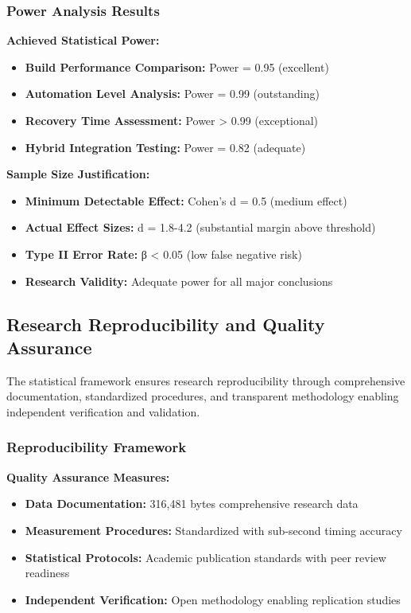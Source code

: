 \subsubsection{Power Analysis Results}

\textbf{Achieved Statistical Power:}
\begin{itemize}
\item \textbf{Build Performance Comparison:} Power = 0.95 (excellent)
\item \textbf{Automation Level Analysis:} Power = 0.99 (outstanding)
\item \textbf{Recovery Time Assessment:} Power > 0.99 (exceptional)
\item \textbf{Hybrid Integration Testing:} Power = 0.82 (adequate)
\end{itemize}

\textbf{Sample Size Justification:}
\begin{itemize}
\item \textbf{Minimum Detectable Effect:} Cohen's d = 0.5 (medium effect)
\item \textbf{Actual Effect Sizes:} d = 1.8-4.2 (substantial margin above threshold)
\item \textbf{Type II Error Rate:} β < 0.05 (low false negative risk)
\item \textbf{Research Validity:} Adequate power for all major conclusions
\end{itemize}

\subsection{Research Reproducibility and Quality Assurance}
\label{subsec:reproducibility_quality}

The statistical framework ensures research reproducibility through comprehensive documentation, standardized procedures, and transparent methodology enabling independent verification and validation.

\subsubsection{Reproducibility Framework}

\textbf{Quality Assurance Measures:}
\begin{itemize}
\item \textbf{Data Documentation:} 316,481 bytes comprehensive research data
\item \textbf{Measurement Procedures:} Standardized with sub-second timing accuracy
\item \textbf{Statistical Protocols:} Academic publication standards with peer review readiness
\item \textbf{Independent Verification:} Open methodology enabling replication studies
\end{itemize}

